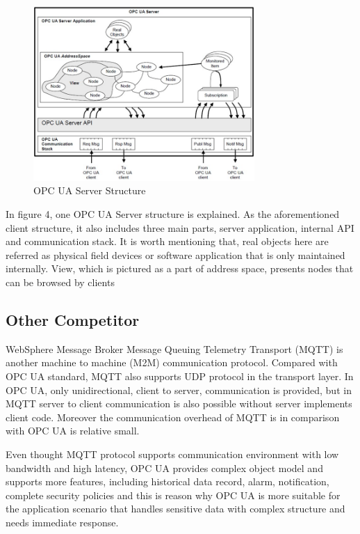 \documentclass[]{llncs}
\begin{document}
\begin{figure}
	\centering
	\includegraphics[width=0.75\textwidth]{server.jpg}
		\caption[ ]{OPC UA Server Structure}
	\label{fig:server}
\end{figure}
In figure 4, one OPC UA Server structure is explained. As the aforementioned client structure, it also includes three main parts, server application, internal API and communication stack. It is worth mentioning that, real objects here are referred as physical field devices or software application that is only maintained internally. View, which is pictured as a part of address space, presents nodes that can be browsed by clients

\subsection{Other Competitor}
WebSphere Message Broker Message Queuing Telemetry Transport (MQTT) is another machine to machine (M2M) communication protocol. Compared with OPC UA standard, MQTT also supports UDP protocol in the transport layer. In OPC UA, only unidirectional, client to server, communication is provided, but in MQTT server to client communication is also possible without server implements client code. Moreover the communication overhead of MQTT is in comparison with OPC UA is relative small. 


Even thought MQTT protocol supports communication environment with low bandwidth and high latency, OPC UA provides complex object model and supports more features, including historical data record, alarm, notification, complete security policies and this is reason why OPC UA is more suitable for the application scenario that handles sensitive data with complex structure and needs immediate response.
\end{document}
